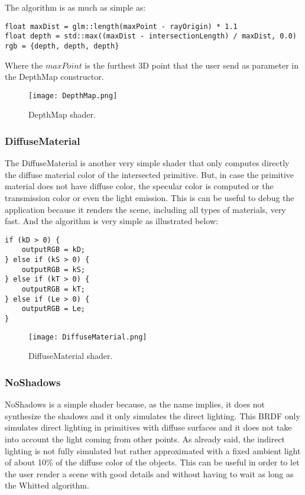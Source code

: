 The algorithm is as much as simple as:

\begin{lstlisting}[caption={Algorithm of DepthMap Shader}, captionpos=b, label=DepthMap]
float maxDist = glm::length(maxPoint - rayOrigin) * 1.1
float depth = std::max((maxDist - intersectionLength) / maxDist, 0.0)
rgb = {depth, depth, depth}
\end{lstlisting}

Where the
$maxPoint$
is the furthest 3D point that the user send as parameter in the DepthMap constructor.

\begin{figure}[H]
	\centering
	\caption{DepthMap shader.}
	\label{DepthMap shader.}
	\texttt{[image: DepthMap.png]}
\end{figure}


\subsubsection{DiffuseMaterial}

\par
The DiffuseMaterial is another very simple shader that only computes directly the diffuse material color of the intersected primitive.
But, in case the primitive material does not have diffuse color, the specular color is computed or the transmission color or even the light emission.
This is can be useful to debug the application because it renders the scene, including all types of materials, very fast.
And the algorithm is very simple as illustrated below:

\begin{lstlisting}[caption={Algorithm of DiffuseMaterial Shader}, captionpos=b, label=DiffuseMaterial]
if (kD > 0) {
	outputRGB = kD;
} else if (kS > 0) {
	outputRGB = kS;
} else if (kT > 0) {
	outputRGB = kT;
} else if (Le > 0) {
	outputRGB = Le;
}
\end{lstlisting}

\begin{figure}[H]
	\centering
	\caption{DiffuseMaterial shader.}
	\label{DiffuseMaterial shader.}
	\texttt{[image: DiffuseMaterial.png]}
\end{figure}


\subsubsection{NoShadows}

\par
NoShadows is a simple shader because, as the name implies, it does not synthesize the shadows and it only simulates the direct lighting.
This BRDF only simulates direct lighting in primitives with diffuse surfaces and it does not take into account the light coming from other points.
As already said, the indirect lighting is not fully simulated but rather approximated with a fixed ambient light of about 10\% of the diffuse color of the objects.
This can be useful in order to let the user render a scene with good details and without having to wait as long as the Whitted algorithm.

